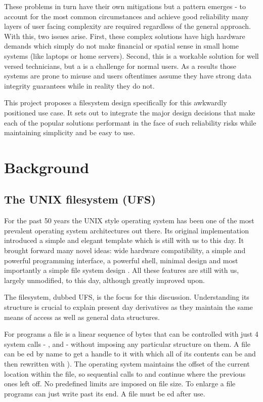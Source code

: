     These problems in turn have their own mitigations but a pattern emerges -
    to account for the most common circumstances and achieve good reliability
    many layers of user facing complexity are required regardless of the
    general approach. With this, two issues arise. First, these complex solutions
    have high hardware demands which simply do not make financial or spatial
    sense in small home systems (like laptops or home servers). Second, this is
    a workable solution for well versed technicians, but a is
    a challenge for normal users. As a results those systems are prone to
    misuse \cite{LTT_data_loss} and users oftentimes assume they have strong data
    integrity guarantees while in reality they do not.

    This project proposes a filesystem design specifically for this awkwardly
    positioned use case. It sets out to integrate the major design decisions
    that make each of the popular solutions performant in the face of such reliability risks
    while maintaining simplicity and be easy to use.

\chapter{Background}
    \section{The UNIX filesystem (UFS)}
        \label{sec:UFS}

        For the past 50 years the UNIX style operating system has been one of
        the most prevalent operating system architectures out there. Its
        original implementation introduced a simple and elegant template which is still
        with us to this day. It brought forward many novel ideas: wide hardware
        compatibility, a simple and powerful programming interface, a powerful shell,
        minimal design and most importantly a simple file system design \cite{UFS}. All these
        features are still with us, largely unmodified, to this day, although
        greatly improved upon.

        The filesystem, dubbed UFS, is the focus for this discussion.
        Understanding its structure is crucial to explain present day
        derivatives as they maintain the same means of access as well as
        general data structures.

        For programs a file is a linear sequence of bytes that can be
        controlled with just 4 system calls -  ,
         and  - without imposing any particular
        structure on them. A file can be ed by name to get a
        handle to it with which all of its contents can be  and
        then rewritten with ). The operating system maintains the
        offset of the current location within the file, so sequential
        calls to  and  continue where the previous
        ones left off. No predefined limits are imposed on file size. To
        enlarge a file programs can just write past its end. A file must be
        ed after use.

